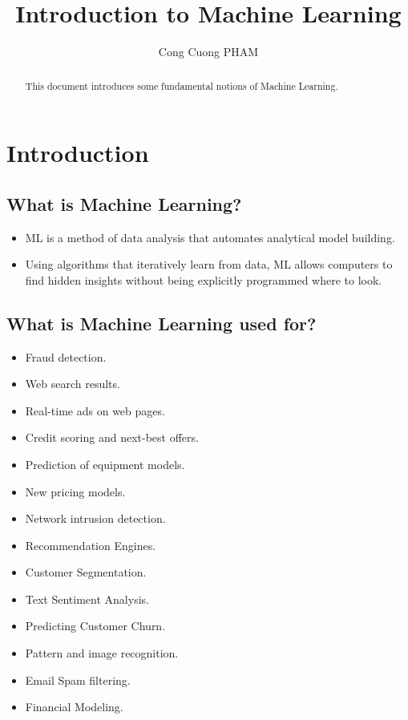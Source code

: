 \documentclass{article}
\begin{document}
\title{Introduction to Machine Learning}
\author{Cong Cuong PHAM}

\maketitle

\begin{abstract}
This document introduces some fundamental notions of Machine Learning.
\end{abstract}

\section{Introduction}
\subsection{What is Machine Learning?}
\begin{itemize}
	\item ML is a method of data analysis that automates analytical model building.
	\item Using algorithms that iteratively learn from data, ML allows computers to find hidden insights without being explicitly programmed where to look.
\end{itemize}

\subsection{What is Machine Learning used for?}
\begin{multicols}{2}
	\begin{itemize}
		\item Fraud detection.
		\item Web search results.
		\item Real-time ads on web pages.
		\item Credit scoring and next-best offers.
		\item Prediction of equipment models.
		\item New pricing models.
		\item Network intrusion detection.
		\item Recommendation Engines.
		\item Customer Segmentation.
		\item Text Sentiment Analysis.
		\item Predicting Customer Churn.
		\item Pattern and image recognition.
		\item Email Spam filtering.
		\item Financial Modeling.
	\end{itemize}
\end{multicols}
\end{document}
